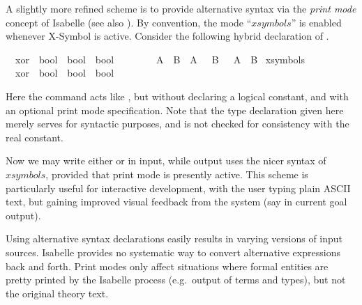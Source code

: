 \begin{isabellebody}
\begin{isamarkuptext}
  \medskip A slightly more refined scheme is to provide alternative
  syntax via the \emph{print mode} concept of
  Isabelle (see also \cite{isabelle-ref}).  By convention, the mode
  ``$xsymbols$'' is enabled whenever X-Symbol is active.  Consider the
  following hybrid declaration of .%
\end{isamarkuptext}%
\isamarkuptrue%
\isamarkupfalse%
\isamarkupfalse%
\isanewline
\ \ xor\ {\isacharcolon}{\isacharcolon}\ {\isachardoublequote}bool\ {\isasymRightarrow}\ bool\ {\isasymRightarrow}\ bool{\isachardoublequote}\ \ \ \ {\isacharparenleft}\ {\isachardoublequote}{\isacharbrackleft}{\isacharplus}{\isacharbrackright}{\isasymignore}{\isachardoublequote}\ {}{}{\isacharparenright}\isanewline
\ \ {\isachardoublequote}A\ {\isacharbrackleft}{\isacharplus}{\isacharbrackright}{\isasymignore}\ B\ {\isasymequiv}\ {\isacharparenleft}A\ {\isasymand}\ {\isasymnot}\ B{\isacharparenright}\ {\isasymor}\ {\isacharparenleft}{\isasymnot}\ A\ {\isasymand}\ B{\isacharparenright}{\isachardoublequote}\isanewline
\isanewline
\isamarkupfalse%
\ {\isacharparenleft}xsymbols{\isacharparenright}\isanewline
\ \ xor\ {\isacharcolon}{\isacharcolon}\ {\isachardoublequote}bool\ {\isasymRightarrow}\ bool\ {\isasymRightarrow}\ bool{\isachardoublequote}\ \ \ \ {\isacharparenleft}\ {\isachardoublequote}{\isasymoplus}{\isasymignore}{\isachardoublequote}\ {}{}{\isacharparenright}\isamarkupfalse%
\isamarkupfalse%
%
\begin{isamarkuptext}%
Here the  command acts like , but
  without declaring a logical constant, and with an optional print
  mode specification.  Note that the type declaration given here
  merely serves for syntactic purposes, and is not checked for
  consistency with the real constant.

  \medskip Now we may write either \isa{{\isacharbrackleft}{\isacharplus}{\isacharbrackright}} or \isa{{\isasymoplus}} in
  input, while output uses the nicer syntax of $xsymbols$, provided
  that print mode is presently active.  This scheme is particularly
  useful for interactive development, with the user typing plain ASCII
  text, but gaining improved visual feedback from the system (say in
  current goal output).

  \begin{warn}
  Using alternative syntax declarations easily results in varying
  versions of input sources.  Isabelle provides no systematic way to
  convert alternative expressions back and forth.  Print modes only
  affect situations where formal entities are pretty printed by the
  Isabelle process (e.g.\ output of terms and types), but not the
  original theory text.
  \end{warn}


\end{isamarkuptext}
\end{isabellebody}
